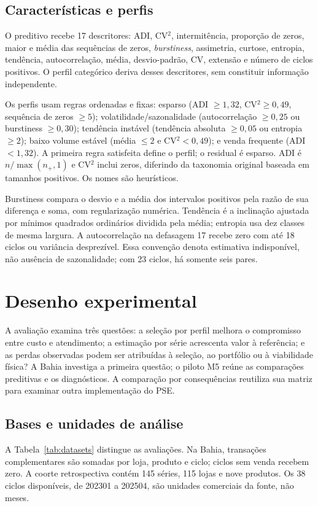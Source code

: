 \documentclass[preprint,12pt]{elsarticle}
\begin{document}
\subsection{Características e perfis}
O preditivo recebe 17 descritores: ADI, CV$^2$, intermitência, proporção de zeros, maior e média das sequências de zeros, \textit{burstiness}, assimetria, curtose, entropia, tendência, autocorrelação, média, desvio-padrão, CV, extensão e número de ciclos positivos. O perfil categórico deriva desses descritores, sem constituir informação independente.

Os perfis usam regras ordenadas e fixas: esparso (ADI $\geq1{,}32$, CV$^2\geq0{,}49$, sequência de zeros $\geq5$); volatilidade/sazonalidade (autocorrelação $\geq0{,}25$ ou burstiness $\geq0{,}30$); tendência instável (tendência absoluta $\geq0{,}05$ ou entropia $\geq2$); baixo volume estável (média $\leq2$ e CV$^2<0{,}49$); e venda frequente (ADI $<1{,}32$). A primeira regra satisfeita define o perfil; o residual é esparso. ADI é $n/\max(n_+,1)$ e CV$^2$ inclui zeros, diferindo da taxonomia original baseada em tamanhos positivos. Os nomes são heurísticos.

Burstiness compara o desvio e a média dos intervalos positivos pela razão de sua diferença e soma, com regularização numérica. Tendência é a inclinação ajustada por mínimos quadrados ordinários dividida pela média; entropia usa dez classes de mesma largura. A autocorrelação na defasagem 17 recebe zero com até 18 ciclos ou variância desprezível. Essa convenção denota estimativa indisponível, não ausência de sazonalidade; com 23 ciclos, há somente seis pares.

\section{Desenho experimental}
A avaliação examina três questões: a seleção por perfil melhora o compromisso entre custo e atendimento; a estimação por série acrescenta valor à referência; e as perdas observadas podem ser atribuídas à seleção, ao portfólio ou à viabilidade física? A Bahia investiga a primeira questão; o piloto M5 reúne as comparações preditivas e os diagnósticos. A comparação por consequências reutiliza sua matriz para examinar outra implementação do PSE.
\subsection{Bases e unidades de análise}
A Tabela~\ref{tab:datasets} distingue as avaliações. Na Bahia, transações complementares são somadas por loja, produto e ciclo; ciclos sem venda recebem zero. A coorte retrospectiva contém 145 séries, 115 lojas e nove produtos. Os 38 ciclos disponíveis, de 202301 a 202504, são unidades comerciais da fonte, não meses.
\end{document}
